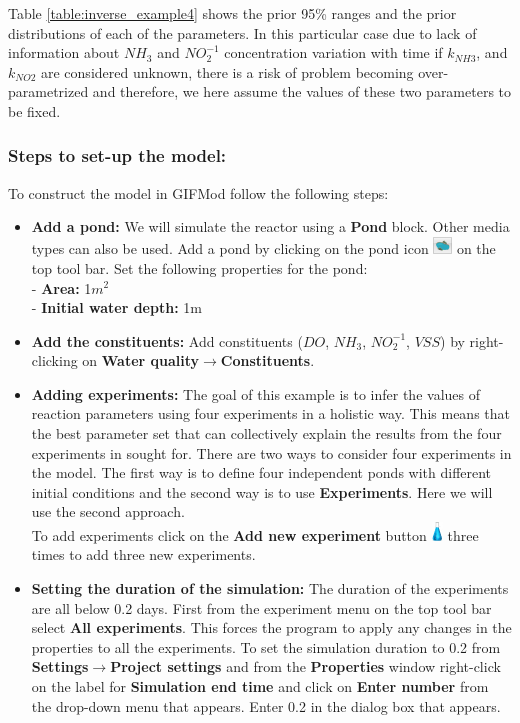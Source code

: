 Table \ref{table:inverse_example4} shows the prior 95\% ranges and the prior distributions of each of the parameters. In this particular case due to lack of information about $NH_3$ and $NO_2^{-1}$ concentration variation with time if $k_{NH3}$, and $k_{NO2}$ are considered unknown, there is a risk of problem becoming over-parametrized and therefore, we here assume the values of these two parameters to be fixed.   

\subsubsection{Steps to set-up the model: }
To construct the model in GIFMod follow the following steps: 
\begin{itemize}
    \item \textbf{Add a pond: } We will simulate the reactor using a \textbf{Pond} block. Other media types can also be used. Add a pond by clicking on the pond icon \includegraphics[width=0.5cm]{Icons/pond_icon.png} on the top tool bar. Set the following properties for the pond: \\
    - \textbf{Area: } 1$m^2$\\
    - \textbf{Initial water depth: } 1m\\
    \item \textbf{Add the constituents: } Add constituents ($DO$, $NH_3$, $NO_2^{-1}$, $VSS$) by right-clicking on \textbf{Water quality}$\rightarrow$\textbf{Constituents}. \item \textbf{Adding experiments: } The goal of this example is to infer the values of reaction parameters using four experiments in a holistic way. This means that the best parameter set that can collectively explain the results from the four experiments in sought for. There are two ways to consider four experiments in the model. The first way is to define four independent ponds with different initial conditions and the second way is to use \textbf{Experiments}. Here we will use the second approach. \\ To add experiments click on the \textbf{Add new experiment} button \includegraphics[width=0.3cm]{Icons/newexperiment_icon.png} three times to add three new experiments. 
    
    \item \textbf{Setting the duration of the simulation: } The duration of the experiments are all below 0.2 days. First from the experiment menu on the top tool bar select \textbf{All experiments}. This forces the program to apply any changes in the properties to all the experiments. To set the simulation duration to 0.2 from \textbf{Settings}$\rightarrow$\textbf{Project settings} and from the \textbf{Properties} window right-click on the label for \textbf{Simulation end time} and click on \textbf{Enter number} from the drop-down menu that appears. Enter 0.2 in the dialog box that appears. 
    

\end{itemize}
